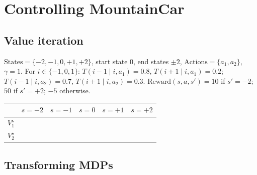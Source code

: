 \section{Controlling MountainCar}
\label{sec:mountaincar}

\subsection{Value iteration}

$\text{States}=\{-2,-1,0,+1,+2\}$, start state $0$, end states $\pm2$, $\text{Actions}=\{a_1,a_2\}$, $\gamma=1$.
For $i\in\{-1,0,1\}$: $T(i-1\mid i,a_1)=0.8$, $T(i+1\mid i,a_1)=0.2$; $T(i-1\mid i,a_2)=0.7$, $T(i+1\mid i,a_2)=0.3$.
$\text{Reward}(s,a,s')=10$ if $s'=-2$; $50$ if $s'=+2$; $-5$ otherwise.

\begin{solution}
\begin{center}
\begin{tabular}{lccccc}
\toprule
 & $s=-2$ & $s=-1$ & $s=0$ & $s=+1$ & $s=+2$\\
\midrule
$V^\star_1$ & \todo{} & \todo{} & \todo{} & \todo{} & \todo{}\\
$V^\star_2$ & \todo{} & \todo{} & \todo{} & \todo{} & \todo{}\\
\bottomrule
\end{tabular}
\end{center}
\end{solution}

\begin{solution}
\end{solution}

\subsection{Transforming MDPs}

